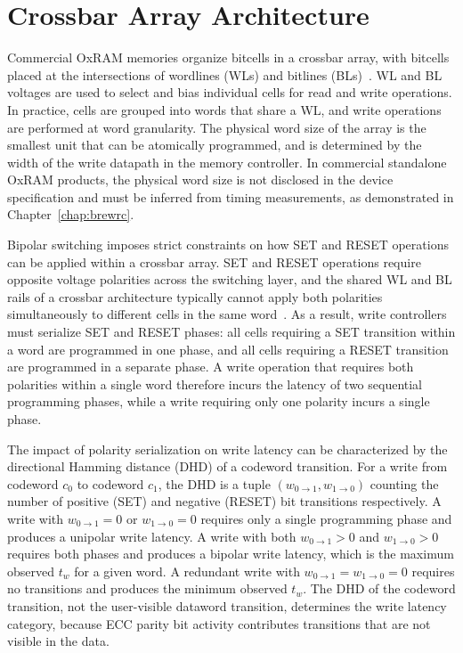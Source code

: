 \section{Crossbar Array Architecture}
\label{sec:bg-crossbar}

Commercial OxRAM memories organize bitcells in a crossbar array, with
bitcells placed at the intersections of wordlines (WLs) and bitlines
(BLs)~\cite{wong2012metal}. WL and BL voltages are used to select and
bias individual cells for read and write operations. In practice, cells
are grouped into words that share a WL, and write operations are
performed at word granularity. The physical word size of the array is
the smallest unit that can be atomically programmed, and is determined
by the width of the write datapath in the memory controller. In
commercial standalone OxRAM products, the physical word size is not
disclosed in the device specification and must be inferred from timing
measurements, as demonstrated in Chapter~\ref{chap:brewrc}.



Bipolar switching imposes strict constraints on how SET and RESET
operations can be applied within a crossbar array. SET and RESET
operations require opposite voltage polarities across the switching
layer, and the shared WL and BL rails of a crossbar architecture
typically cannot apply both polarities simultaneously to different cells
in the same word~\cite{xu2015overcoming, mao2016optimizing}. As a
result, write controllers must serialize SET and RESET phases: all cells
requiring a SET transition within a word are programmed in one phase,
and all cells requiring a RESET transition are programmed in a separate
phase. A write operation that requires both polarities within a single
word therefore incurs the latency of two sequential programming phases,
while a write requiring only one polarity incurs a single phase.

The impact of polarity serialization on write latency can be
characterized by the directional Hamming distance (DHD) of a codeword
transition. For a write from codeword $c_0$ to codeword $c_1$, the DHD
is a tuple $(w_{0\to1}, w_{1\to0})$ counting the number of positive
(SET) and negative (RESET) bit transitions respectively. A write with
$w_{0\to1} = 0$ or $w_{1\to0} = 0$ requires only a single programming
phase and produces a unipolar write latency. A write with both
$w_{0\to1} > 0$ and $w_{1\to0} > 0$ requires both phases and produces a
bipolar write latency, which is the maximum observed $t_w$ for a given
word. A redundant write with $w_{0\to1} = w_{1\to0} = 0$ requires no
transitions and produces the minimum observed $t_w$. The DHD of the
codeword transition, not the user-visible dataword transition,
determines the write latency category, because ECC parity bit activity
contributes transitions that are not visible in the data.

